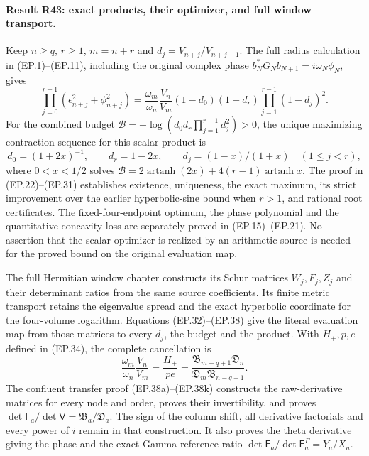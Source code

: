 \paragraph{Result R43: exact products, their optimizer, and full window transport.}
Keep $n\ge q$, $r\ge1$, $m=n+r$ and $d_j=V_{n+j}/V_{n+j-1}$.
The full radius calculation in (EP.1)--(EP.11), including the
original complex phase $b_N^*G_Nb_{N+1}=i\omega_N\phi_N$, gives
\[
 \prod_{j=0}^{r-1}(\epsilon_{n+j}^2+\phi_{n+j}^2)
 =\frac{\omega_m}{\omega_n}\frac{V_n}{V_m}
    (1-d_0)(1-d_r)\prod_{j=1}^{r-1}(1-d_j)^2.
\]
For the combined budget
$\mathcal B=-\log(d_0d_r\prod_{j=1}^{r-1}d_j^2)>0$,
the unique maximizing contraction sequence for this scalar product is
\[
 d_0=(1+2x)^{-1},\qquad d_r=1-2x,\qquad
 d_j=(1-x)/(1+x)\quad(1\le j<r),
\]
where $0<x<1/2$ solves
$\mathcal B=2\operatorname{artanh}(2x)+4(r-1)\operatorname{artanh}x$.
The proof in (EP.22)--(EP.31) establishes existence, uniqueness,
the exact maximum, its strict improvement over the earlier
hyperbolic-sine bound when $r>1$, and rational root certificates.
The fixed-four-endpoint optimum, the phase polynomial and the
quantitative concavity loss are separately proved in (EP.15)--(EP.21).
No assertion that the scalar optimizer is realized by an arithmetic
source is needed for the proved bound on the original evaluation map.

The full Hermitian window chapter constructs its Schur matrices
$W_j,F_j,Z_j$ and their determinant ratios from the same source
coefficients. Its finite metric transport retains the eigenvalue
spread and the exact hyperbolic coordinate for the four-volume
logarithm. Equations (EP.32)--(EP.38) give the literal evaluation
map from those matrices to every $d_j$, the budget and the product.
With $H_+,p,e$ defined in (EP.34), the complete cancellation is
\[
 \frac{\omega_m}{\omega_n}\frac{V_n}{V_m}
 =\frac{H_+}{pe}
 =\frac{\mathfrak B_{m-q+1}\mathfrak D_n}
        {\mathfrak D_m\mathfrak B_{n-q+1}}.
\]
The confluent transfer proof (EP.38a)--(EP.38k) constructs the
raw-derivative matrices for every node and order, proves their
invertibility, and proves
$\det\mathsf F_a/\det\mathsf V=\mathfrak B_a/\mathfrak D_a$.
The sign of the column shift, all derivative factorials and every
power of $i$ remain in that construction. It also proves the
theta derivative giving the phase and the exact Gamma-reference
ratio $\det\mathsf F_a/\det\mathsf F_a^\Gamma=Y_a/X_a$.

